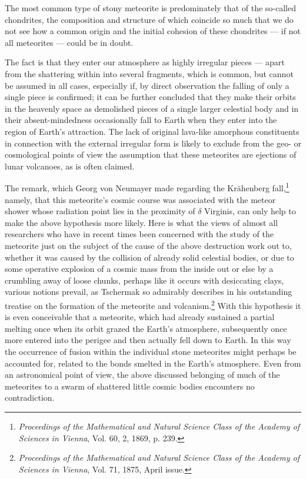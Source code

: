 \documentclass[a4paper, 12pt, oneside]{article}
\begin{document}
The most common type of stony meteorite is predominately that of the so-called chondrites, the composition and structure of which coincide so much that we do not see how a common origin and the initial cohesion of these chondrites --- if not all meteorites --- could be in doubt.

The fact is that they enter our atmosphere as highly irregular pieces --- apart from the shattering within into several fragments, which is common, but cannot be assumed in all cases, especially if, by direct observation the falling of only a single piece is confirmed; it can be further concluded that they make their orbits in the heavenly space as demolished pieces of a single larger celestial body and in their absent-mindedness occasionally fall to Earth when they enter into the region of Earth's attraction. The lack of original lava-like amorphous constituents in connection with the external irregular form is likely to exclude from the geo- or cosmological points of view the assumption that these meteorites are ejections of lunar volcanoes, as is often claimed.

The remark, which Georg von Neumayer made regarding the Krähenberg fall,\footnote{\emph{Proceedings of the Mathematical and Natural Science Class of the Academy of Sciences in Vienna}, Vol. 60, 2, 1869, p. 239.} namely, that this meteorite's cosmic course was associated with the meteor shower whose radiation point lies in the proximity of $\delta$ Virginis, can only help to make the above hypothesis more likely. Here is what the views of almost all researchers who have in recent times been concerned with the study of the meteorite just on the subject of the cause of the above destruction work out to, whether it was caused by the collision of already solid celestial bodies, or due to some operative explosion of a cosmic mass from the inside out or else by a crumbling away of loose chunks, perhaps like it occurs with desiccating clays, various notions prevail, as Tschermak so admirably describes in his outstanding treatise on the formation of the meteorite and volcanism.\footnote{\emph{Proceedings of the Mathematical and Natural Science Class of the Academy of Sciences in Vienna}, Vol. 71, 1875, April issue.} With this hypothesis it is even conceivable that a meteorite, which had already sustained a partial melting once when its orbit grazed the Earth's atmosphere, subsequently once more entered into the perigee and then actually fell down to Earth. In this way the occurrence of fusion within the individual stone meteorites might perhaps be accounted for, related to the bonds smelted in the Earth's atmosphere. Even from an astronomical point of view, the above discussed belonging of much of the meteorites to a swarm of shattered little cosmic bodies encounters no contradiction.
\end{document}

